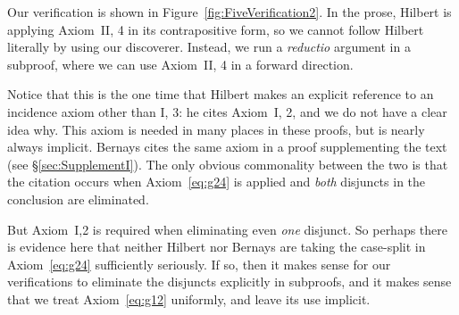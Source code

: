 Our verification is shown in Figure~\ref{fig:FiveVerification2}. In the prose, Hilbert is applying Axiom~II, 4 in its contrapositive form, so we cannot follow Hilbert literally by using our  discoverer. Instead, we run a \emph{reductio} argument in a subproof, where we can use Axiom~II, 4 in a forward direction.

\label{sec:g12Erratic}Notice that this is the one time that Hilbert makes an explicit reference to an incidence axiom other than I, 3: he cites Axiom~I, 2, and we do not have a clear idea why. This axiom is needed in many places in these proofs, but is nearly always implicit. Bernays cites the same axiom in a proof supplementing the text (see \S\ref{sec:SupplementI}). The only obvious commonality between the two is that the citation occurs when Axiom~\ref{eq:g24} is applied and \emph{both} disjuncts in the conclusion are eliminated. 

But Axiom~I,2 is required when eliminating even \emph{one} disjunct. So perhaps there is evidence here that neither Hilbert nor Bernays are taking the case-split in Axiom~\ref{eq:g24} sufficiently seriously. If so, then it makes sense for our verifications to eliminate the disjuncts explicitly in subproofs, and it makes sense that we treat Axiom~\ref{eq:g12} uniformly, and leave its use implicit.

